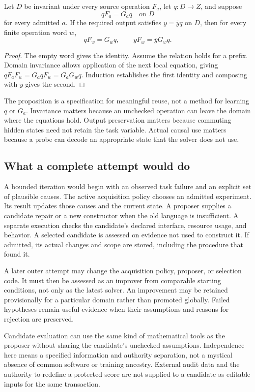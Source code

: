 \begin{SIIproposition}\label{SII:prop:continuation}
Let $D$ be invariant under every source operation $F_a$, let $q:D\to Z$, and suppose
\[
qF_a=G_aq\quad\text{on }D
\]
for every admitted $a$. If the required output satisfies $y=\bar yq$ on $D$, then for every finite operation word $w$,
\[
qF_w=G_wq,\qquad yF_w=\bar yG_wq.
\]
\end{SIIproposition}
\begin{proof}
The empty word gives the identity. Assume the relation holds for a prefix. Domain invariance allows application of the next local equation, giving $qF_aF_w=G_aqF_w=G_aG_wq$. Induction establishes the first identity and composing with $\bar y$ gives the second.
\end{proof}

The proposition is a specification for meaningful reuse, not a method for learning $q$ or $G_a$. Invariance matters because an unchecked operation can leave the domain where the equations hold. Output preservation matters because commuting hidden states need not retain the task variable. Actual causal use matters because a probe can decode an appropriate state that the solver does not use.

\subsection{What a complete attempt would do}
A bounded iteration would begin with an observed task failure and an explicit set of plausible causes. The active acquisition policy chooses an admitted experiment. Its result updates those causes and the current state. A proposer supplies a candidate repair or a new constructor when the old language is insufficient. A separate execution checks the candidate's declared interface, resource usage, and behavior. A selected candidate is assessed on evidence not used to construct it. If admitted, its actual changes and scope are stored, including the procedure that found it.

A later outer attempt may change the acquisition policy, proposer, or selection code. It must then be assessed as an improver from comparable starting conditions, not only as the latest solver. An improvement may be retained provisionally for a particular domain rather than promoted globally. Failed hypotheses remain useful evidence when their assumptions and reasons for rejection are preserved.

Candidate evaluation can use the same kind of mathematical tools as the proposer without sharing the candidate's unchecked assumptions. Independence here means a specified information and authority separation, not a mystical absence of common software or training ancestry. External audit data and the authority to redefine a protected score are not supplied to a candidate as editable inputs for the same transaction.

